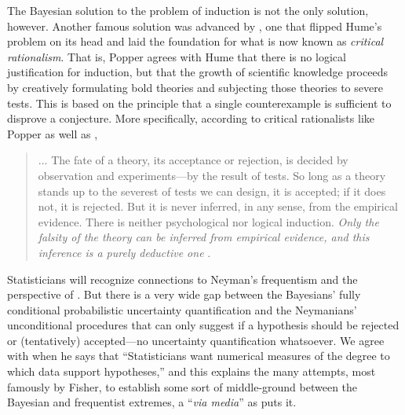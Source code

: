 \documentclass[a4paper, 12pt]{article}
\theoremstyle{plain}
\theoremstyle{definition}
\theoremstyle{remark}
\begin{document}
The Bayesian solution to the problem of induction is not the only solution, however.  Another famous solution was advanced by \citet{popper1959}, one that flipped Hume's problem on its head and laid the foundation for what is now known as {\em critical rationalism}.  That is, Popper agrees with Hume that there is no logical justification for induction, but that the growth of scientific knowledge proceeds by creatively formulating bold theories and subjecting those theories to severe tests.  This is based on the principle that a single counterexample is sufficient to disprove a conjecture.  More specifically, according to critical rationalists like Popper as well as \citet{deutsch.fabric, deutsch.infinity}, 
\begin{quote}
... The fate of a theory, its acceptance or rejection, is decided by observation and experiments---by the result of tests.  So long as a theory stands up to the severest of tests we can design, it is accepted; if it does not, it is rejected. But it is never inferred, in any sense, from the empirical evidence.  There is neither psychological nor logical induction.  {\em Only the falsity of the theory can be inferred from empirical evidence, and this inference is a purely deductive one} \citep[][p.~72]{popper1962}.
\end{quote} 
Statisticians will recognize connections to Neyman's frequentism \citep[e.g.,][]{neymanpearson1933, neyman1955} and the perspective of \citet{mayo.book.1996, mayo.book.2018}.  But there is a very wide gap between the Bayesians' fully conditional probabilistic uncertainty quantification and the Neymanians' unconditional procedures that can only suggest if a hypothesis should be rejected or (tentatively) accepted---no uncertainty quantification whatsoever.  We agree with \citet[][p.~122]{hacking.logic.book} when he says that ``Statisticians want numerical measures of the degree to which data support hypotheses,'' and this explains the many attempts, most famously by Fisher, to establish some sort of middle-ground between the Bayesian and frequentist extremes, a ``{\em via media}'' as \citet[][p.~269]{basu1975} puts it.  
\end{document}
